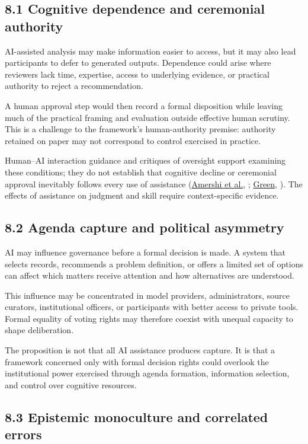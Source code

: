\documentclass[
  10pt,
]{article}
\newcommand{\axCite}[2]{\hyperlink{cite.#1}{#2}, \citeyear{#1}}
\begin{document}
\subsection{8.1 Cognitive dependence and ceremonial
authority}\label{cognitive-dependence-and-ceremonial-authority}

AI-assisted analysis may make information easier to access, but it may
also lead participants to defer to generated outputs. Dependence could
arise where reviewers lack time, expertise, access to underlying
evidence, or practical authority to reject a recommendation.

A human approval step would then record a formal disposition while
leaving much of the practical framing and evaluation outside effective
human scrutiny. This is a challenge to the framework's human-authority
premise: authority retained on paper may not correspond to control
exercised in practice.

Human--AI interaction guidance and critiques of oversight support
examining these conditions; they do not establish that cognitive decline
or ceremonial approval inevitably follows every use of assistance
(\axCite{amershi2019guidelines}{Amershi et al.}; \axCite{green2022flaws}{Green}). The effects of assistance on
judgment and skill require context-specific evidence.

\subsection{8.2 Agenda capture and political
asymmetry}\label{agenda-capture-and-political-asymmetry}

AI may influence governance before a formal decision is made. A system
that selects records, recommends a problem definition, or offers a
limited set of options can affect which matters receive attention and
how alternatives are understood.

This influence may be concentrated in model providers, administrators,
source curators, institutional officers, or participants with better
access to private tools. Formal equality of voting rights may therefore
coexist with unequal capacity to shape deliberation.

The proposition is not that all AI assistance produces capture. It is
that a framework concerned only with formal decision rights could
overlook the institutional power exercised through agenda formation,
information selection, and control over cognitive resources.

\subsection{8.3 Epistemic monoculture and correlated
errors}\label{epistemic-monoculture-and-correlated-errors}
\end{document}
